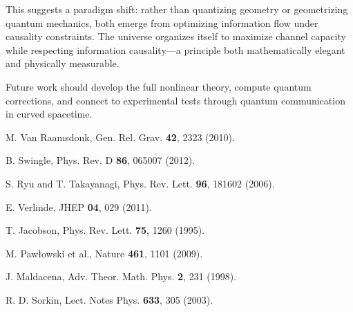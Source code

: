 \documentclass[aps,prl,twocolumn,showpacs,superscriptaddress,groupedaddress]{revtex4-2}
\begin{document}
This suggests a paradigm shift: rather than quantizing geometry or geometrizing quantum mechanics, both emerge from optimizing information flow under causality constraints. The universe organizes itself to maximize channel capacity while respecting information causality—a principle both mathematically elegant and physically measurable.

Future work should develop the full nonlinear theory, compute quantum corrections, and connect to experimental tests through quantum communication in curved spacetime.


\begin{thebibliography}{99}

M. Van Raamsdonk, Gen. Rel. Grav. \textbf{42}, 2323 (2010).

B. Swingle, Phys. Rev. D \textbf{86}, 065007 (2012).

S. Ryu and T. Takayanagi, Phys. Rev. Lett. \textbf{96}, 181602 (2006).

E. Verlinde, JHEP \textbf{04}, 029 (2011).

T. Jacobson, Phys. Rev. Lett. \textbf{75}, 1260 (1995).

M. Pawłowski et al., Nature \textbf{461}, 1101 (2009).

J. Maldacena, Adv. Theor. Math. Phys. \textbf{2}, 231 (1998).

R. D. Sorkin, Lect. Notes Phys. \textbf{633}, 305 (2003).

\end{thebibliography}
\end{document}
